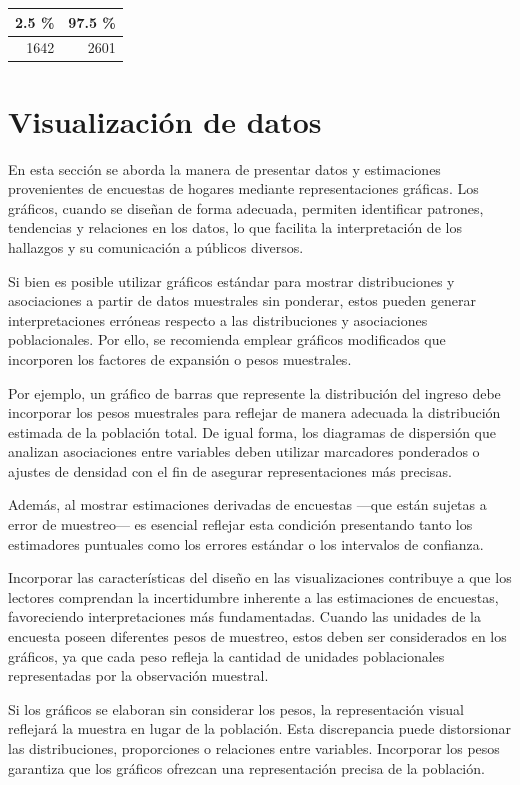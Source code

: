 \documentclass[
  spanish,
  12pt,
]{book}
\begin{document}
\begin{tabular}{r|r}
\hline
2.5 \% & 97.5 \%\\
\hline
1642 & 2601\\
\hline
\end{tabular}

\chapter{Visualización de datos}\label{visualizaciuxf3n-de-datos}

En esta sección se aborda la manera de presentar datos y estimaciones provenientes de encuestas de hogares mediante representaciones gráficas. Los gráficos, cuando se diseñan de forma adecuada, permiten identificar patrones, tendencias y relaciones en los datos, lo que facilita la interpretación de los hallazgos y su comunicación a públicos diversos.

Si bien es posible utilizar gráficos estándar para mostrar distribuciones y asociaciones a partir de datos muestrales sin ponderar, estos pueden generar interpretaciones erróneas respecto a las distribuciones y asociaciones poblacionales. Por ello, se recomienda emplear gráficos modificados que incorporen los factores de expansión o pesos muestrales.

Por ejemplo, un gráfico de barras que represente la distribución del ingreso debe incorporar los pesos muestrales para reflejar de manera adecuada la distribución estimada de la población total. De igual forma, los diagramas de dispersión que analizan asociaciones entre variables deben utilizar marcadores ponderados o ajustes de densidad con el fin de asegurar representaciones más precisas.

Además, al mostrar estimaciones derivadas de encuestas ---que están sujetas a error de muestreo--- es esencial reflejar esta condición presentando tanto los estimadores puntuales como los errores estándar o los intervalos de confianza.

Incorporar las características del diseño en las visualizaciones contribuye a que los lectores comprendan la incertidumbre inherente a las estimaciones de encuestas, favoreciendo interpretaciones más fundamentadas. Cuando las unidades de la encuesta poseen diferentes pesos de muestreo, estos deben ser considerados en los gráficos, ya que cada peso refleja la cantidad de unidades poblacionales representadas por la observación muestral.

Si los gráficos se elaboran sin considerar los pesos, la representación visual reflejará la muestra en lugar de la población. Esta discrepancia puede distorsionar las distribuciones, proporciones o relaciones entre variables. Incorporar los pesos garantiza que los gráficos ofrezcan una representación precisa de la población.
\end{document}

